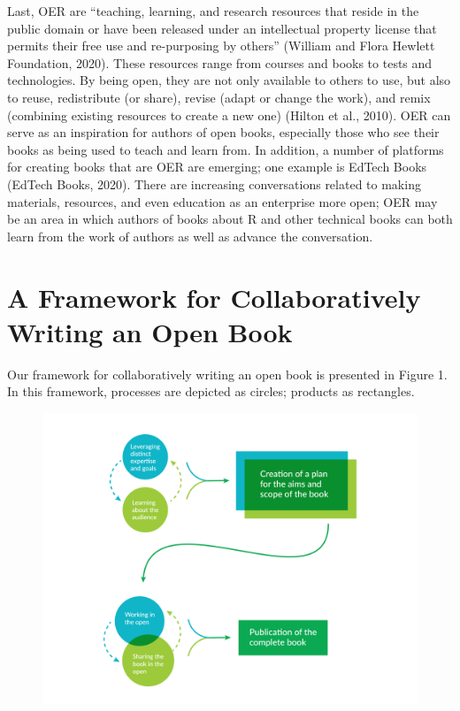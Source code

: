 \documentclass[
  english,
  man]{apa6}
\begin{document}
Last, OER are ``teaching, learning, and research resources that reside in the public domain or have been released under an intellectual property license that permits their free use and re-purposing by others'' (William and Flora Hewlett Foundation, 2020). These resources range from courses and books to tests and technologies. By being open, they are not only available to others to use, but also to reuse, redistribute (or share), revise (adapt or change the work), and remix (combining existing resources to create a new one) (Hilton et al., 2010). OER can serve as an inspiration for authors of open books, especially those who see their books as being used to teach and learn from. In addition, a number of platforms for creating books that are OER are emerging; one example is EdTech Books (EdTech Books, 2020). There are increasing conversations related to making materials, resources, and even education as an enterprise more open; OER may be an area in which authors of books about R and other technical books can both learn from the work of authors as well as advance the conversation.

\hypertarget{a-framework-for-collaboratively-writing-an-open-book}{%
\section{A Framework for Collaboratively Writing an Open Book}\label{a-framework-for-collaboratively-writing-an-open-book}}

Our framework for collaboratively writing an open book is presented in Figure 1. In this framework, processes are depicted as circles; products as rectangles.

\begin{figure}
\includegraphics[width=8.5in]{framework-diagram} \caption{ }\label{fig:unnamed-chunk-1}
\end{figure}
\end{document}
